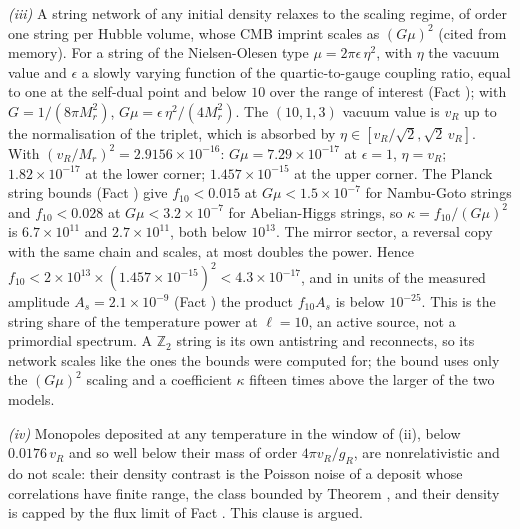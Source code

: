 \emph{(iii)} A string network of any initial density relaxes to the scaling regime, of order one string per Hubble volume, whose CMB imprint scales as $(G\mu)^{2}$ (cited from memory). For a string of the Nielsen-Olesen type $\mu = 2\pi\epsilon\,\eta^{2}$, with $\eta$ the vacuum value and $\epsilon$ a slowly varying function of the quartic-to-gauge coupling ratio, equal to one at the self-dual point and below $10$ over the range of interest (Fact ); with $G = 1/(8\pi M_{r}^{2})$, $G\mu = \epsilon\,\eta^{2}/(4M_{r}^{2})$. The $(10,1,3)$ vacuum value is $v_{R}$ up to the normalisation of the triplet, which is absorbed by $\eta \in [v_{R}/\sqrt2, \sqrt2\,v_{R}]$. With $(v_{R}/M_{r})^{2} = 2.9156 \times 10^{-16}$: $G\mu = 7.29 \times 10^{-17}$ at $\epsilon = 1$, $\eta = v_{R}$; $1.82 \times 10^{-17}$ at the lower corner; $1.457 \times 10^{-15}$ at the upper corner. The Planck string bounds (Fact ) give $f_{10} < 0.015$ at $G\mu < 1.5 \times 10^{-7}$ for Nambu-Goto strings and $f_{10} < 0.028$ at $G\mu < 3.2 \times 10^{-7}$ for Abelian-Higgs strings, so $\kappa = f_{10}/(G\mu)^{2}$ is $6.7 \times 10^{11}$ and $2.7 \times 10^{11}$, both below $10^{13}$. The mirror sector, a reversal copy with the same chain and scales, at most doubles the power. Hence $f_{10} < 2 \times 10^{13} \times (1.457 \times 10^{-15})^{2} < 4.3 \times 10^{-17}$, and in units of the measured amplitude $A_{s} = 2.1 \times 10^{-9}$ (Fact ) the product $f_{10}A_{s}$ is below $10^{-25}$. This is the string share of the temperature power at $\ell = 10$, an active source, not a primordial spectrum. A $\mathbb{Z}_{2}$ string is its own antistring and reconnects, so its network scales like the ones the bounds were computed for; the bound uses only the $(G\mu)^{2}$ scaling and a coefficient $\kappa$ fifteen times above the larger of the two models.

\emph{(iv)} Monopoles deposited at any temperature in the window of (ii), below $0.0176\,v_{R}$ and so well below their mass of order $4\pi v_{R}/g_{R}$, are nonrelativistic and do not scale: their density contrast is the Poisson noise of a deposit whose correlations have finite range, the class bounded by Theorem , and their density is capped by the flux limit of Fact . This clause is argued.

